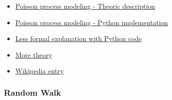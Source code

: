 \documentclass{article}
\begin{document}
\begin{itemize}
  \item \href{https://www.probabilitycourse.com/chapter11/11_1_2_basic_concepts_of_the_poisson_process.php}{Poisson process modeling - Theoric description}
  \item \href{https://www.probabilitycourse.com/chapter14/Chapter_14.pdf}{Poisson process modeling - Python implementation}
  \item \href{https://timeseriesreasoning.com/contents/poisson-process/}{Less formal explanation with Python code}
  \item \href{https://www.math.wsu.edu/faculty/genz/416/lect/l05-45.pdf}{More theory}
  \item \href{https://en.wikipedia.org/wiki/Poisson_point_process}{Wikipedia entry}
\end{itemize}



\subsubsection{Random Walk}
\end{document}
